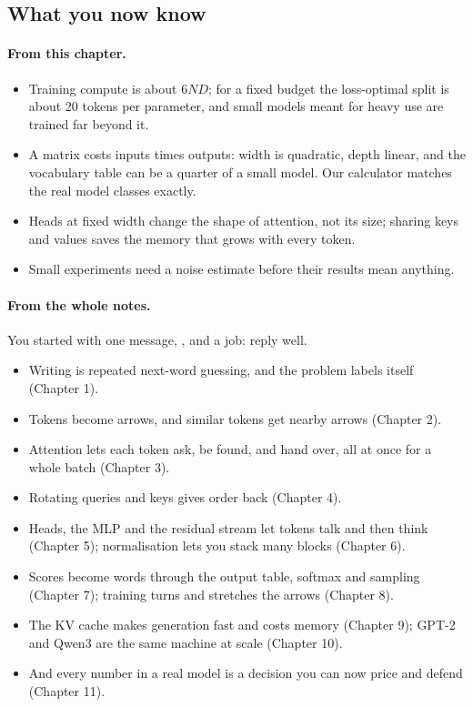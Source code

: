 \subsection*{What you now know}

\paragraph{From this chapter.}
\begin{itemize}
\item Training compute is about $6ND$; for a fixed budget the loss-optimal split is about 20 tokens per
parameter, and small models meant for heavy use are trained far beyond it.
\item A matrix costs inputs times outputs: width is quadratic, depth linear, and the vocabulary table can be
a quarter of a small model. Our calculator matches the real model classes exactly.
\item Heads at fixed width change the shape of attention, not its size; sharing keys and values saves the
memory that grows with every token.
\item Small experiments need a noise estimate before their results mean anything.
\end{itemize}

\paragraph{From the whole notes.} You started with one message, , and a job: reply well.
\begin{itemize}
\item Writing is repeated next-word guessing, and the problem labels itself (Chapter 1).
\item Tokens become arrows, and similar tokens get nearby arrows (Chapter 2).
\item Attention lets each token ask, be found, and hand over, all at once for a whole batch (Chapter 3).
\item Rotating queries and keys gives order back (Chapter 4).
\item Heads, the MLP and the residual stream let tokens talk and then think (Chapter 5); normalisation lets
you stack many blocks (Chapter 6).
\item Scores become words through the output table, softmax and sampling (Chapter 7); training turns and
stretches the arrows (Chapter 8).
\item The KV cache makes generation fast and costs memory (Chapter 9); GPT-2 and Qwen3 are the same machine at
scale (Chapter 10).
\item And every number in a real model is a decision you can now price and defend (Chapter 11).
\end{itemize}
